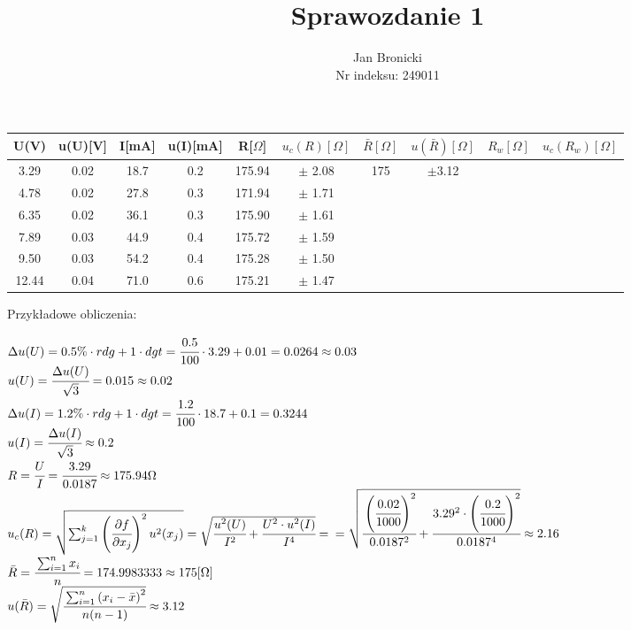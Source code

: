\documentclass{article}
\title{Sprawozdanie 1}
\author{Jan Bronicki\\
Nr indeksu: 249011}
\date{}
\begin{document}
\maketitle



\begin{center}
    \renewcommand{\arraystretch}{1.3}
\begin{tabular}{ |c|c|c|c|c|c|c|c|c|c| }
    \hline
    U(V)&u(U)[V]&I[mA]&u(I)[mA]&R[$\Omega$]&$u_c(R)[\Omega]$&$\bar{R}[\Omega]$&$u(\bar{R})[\Omega]$&$R_w[\Omega]$&$u_c(R_w)[\Omega]$ \\
    \hline \hline
    3.29&0.02&18.7&0.2&175.94&$\pm$ 2.08& \multirow{6}{*}{175}&\multirow{6}{*}{$\pm$3.12}&&\\ 
    \cline{1-6}
    \cline{9-10}
    4.78&0.02&27.8&0.3&171.94&$\pm$ 1.71&&&&\\ 
    \cline{1-6}
    \cline{9-10}
    6.35&0.02&36.1&0.3&175.90&$\pm$ 1.61&&&&\\ 
    \cline{1-6}
    \cline{9-10}
    7.89&0.03&44.9&0.4&175.72&$\pm$ 1.59&&&&\\ 
    \cline{1-6}
    \cline{9-10}
    9.50&0.03&54.2&0.4&175.28&$\pm$ 1.50&&&&\\ 
    \cline{1-6}
    \cline{9-10}
    12.44&0.04&71.0&0.6&175.21&$\pm$ 1.47&&&&\\ 
    \hline
\end{tabular}
\end{center}
Przykładowe obliczenia:
\begin{center}
    $\Delta u(U)  = 0.5\% \cdot rdg+1 \cdot dgt=\cfrac{0.5}{100} \cdot 3.29 + 0.01=0.0264\approx0.03$\\
    $u(U)=\cfrac{\Delta u(U)}{\sqrt{3}}=0.015\approx0.02$\\
    $\Delta u(I) = 1.2\% \cdot rdg+1 \cdot dgt = \cfrac{1.2}{100} \cdot 18.7 +0.1 =0.3244$\\
    $u(I)= \cfrac{\Delta u(I)}{\sqrt{3}} \approx 0.2$\\
    $R=\cfrac{U}{I} = \cfrac{3.29}{0.0187} \approx 175.94 \Omega$\\
    $u_c (R)=\sqrt{\sum_{j=1}^{k}\left( \cfrac{\partial f}{\partial x_j}\right)^2 u^2 (x_j)}
    =\sqrt{\cfrac{u^2 (U)}{I^2} + \cfrac{U^2 \cdot u^2 (I)}{I^4}}=$
    $= \sqrt{\cfrac{\left(\cfrac{0.02}{1000}\right)^2}{0.0187^2} + \cfrac{3.29^2 \cdot \left(\cfrac{0.2}{1000}\right)^2}{0.0187^4}}\approx 2.16$\\
    $\bar{R} = \cfrac{\sum_{i=1}^{n}x_i}{n}=174.9983333 \approx 175[\Omega]$\\
    $u(\bar{R}) = \sqrt{\cfrac{\sum_{i=1}^{n} \left(x_i - \bar{x} \right)^2}{n(n-1)}}\approx 3.12$\\

\end{center}
\end{document}

